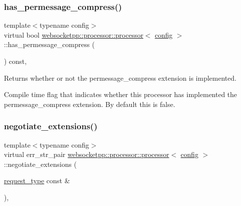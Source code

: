 \subsubsection{\texorpdfstring{has\+\_\+permessage\+\_\+compress()}{has\_permessage\_compress()}}
{\footnotesize\ttfamily template$<$typename config$>$ \\
virtual bool \mbox{\hyperlink{classwebsocketpp_1_1processor_1_1processor}{websocketpp\+::processor\+::processor}}$<$ \mbox{\hyperlink{classconfig}{config}} $>$\+::has\+\_\+permessage\+\_\+compress (\begin{DoxyParamCaption}{ }\end{DoxyParamCaption}) const\hspace{0.3cm}{\ttfamily [inline]}, {\ttfamily [virtual]}}



Returns whether or not the permessage\+\_\+compress extension is implemented. 

Compile time flag that indicates whether this processor has implemented the permessage\+\_\+compress extension. By default this is false. \mbox{\label{classwebsocketpp_1_1processor_1_1processor_aad69873505ba59f4ddf53e864f32bb80}} 
\subsubsection{\texorpdfstring{negotiate\+\_\+extensions()}{negotiate\_extensions()}\hspace{0.1cm}{\footnotesize\ttfamily [1/2]}}
{\footnotesize\ttfamily template$<$typename config$>$ \\
virtual err\+\_\+str\+\_\+pair \mbox{\hyperlink{classwebsocketpp_1_1processor_1_1processor}{websocketpp\+::processor\+::processor}}$<$ \mbox{\hyperlink{classconfig}{config}} $>$\+::negotiate\+\_\+extensions (\begin{DoxyParamCaption}\item[{\mbox{\hyperlink{classwebsocketpp_1_1http_1_1parser_1_1request}{request\+\_\+type}} const \&}]{ }\end{DoxyParamCaption})\hspace{0.3cm}{\ttfamily [inline]}, {\ttfamily [virtual]}}



